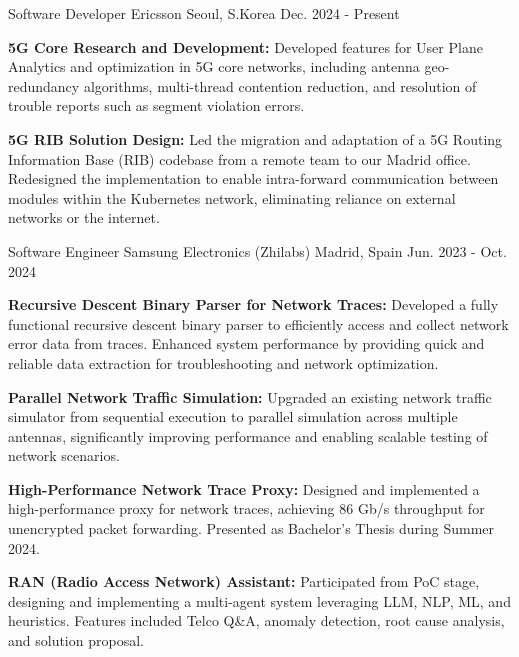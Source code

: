 
\begin{cventries}

  \cventry
    {Software Developer} %
    {Ericsson} %
    {Seoul, S.Korea} %
    {Dec. 2024 - Present} %
    {
      \begin{cvitems} %
        \item {\textbf{5G Core Research and Development:} Developed features for User Plane Analytics and optimization in 5G core networks, including antenna geo-redundancy algorithms, multi-thread contention reduction, and resolution of trouble reports such as segment violation errors.}
        \item {\textbf{5G RIB Solution Design:} Led the migration and adaptation of a 5G Routing Information Base (RIB) codebase from a remote team to our Madrid office. Redesigned the implementation to enable intra-forward communication between modules within the Kubernetes network, eliminating reliance on external networks or the internet.}
      \end{cvitems}
    }

  \cventry
    {Software Engineer} %
    {Samsung Electronics (Zhilabs)} %
    {Madrid, Spain} %
    {Jun. 2023 - Oct. 2024} %
    {
      \begin{cvitems} %
        \item {\textbf{Recursive Descent Binary Parser for Network Traces:} Developed a fully functional recursive descent binary parser to efficiently access and collect network error data from traces. Enhanced system performance by providing quick and reliable data extraction for troubleshooting and network optimization.}
        \item {\textbf{Parallel Network Traffic Simulation:} Upgraded an existing network traffic simulator from sequential execution to parallel simulation across multiple antennas, significantly improving performance and enabling scalable testing of network scenarios.}
        \item {\textbf{High-Performance Network Trace Proxy:} Designed and implemented a high-performance proxy for network traces, achieving 86 Gb/s throughput for unencrypted packet forwarding. Presented as Bachelor's Thesis during Summer 2024.}
        \item {\textbf{RAN (Radio Access Network) Assistant:} Participated from PoC stage, designing and implementing a multi-agent system leveraging LLM, NLP, ML, and heuristics. Features included Telco Q\&A, anomaly detection, root cause analysis, and solution proposal.}
      \end{cvitems}
    }

\end{cventries}

